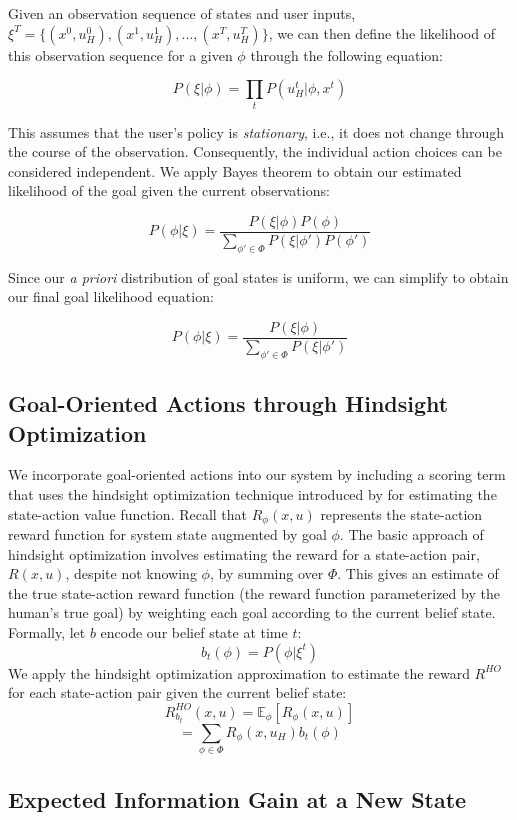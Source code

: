 \documentclass[conference]{IEEEtran}
\begin{document}
Given an observation sequence of states and user inputs, $\xi^T = \{(x^0, u_H^0), (x^1, u_H^1), ..., (x^T, u_H^T)\}$, we can then define the likelihood of this observation sequence for a given $\phi$ through the following equation:

\[
P(\xi|\phi) = \prod_tP(u_H^t|\phi, x^t)
\]

This assumes that the user's policy is \textit{stationary}, i.e., it does not change through the course of the observation. Consequently, the individual action choices can be considered independent. We apply Bayes theorem to obtain our estimated likelihood of the goal given the current observations:

\[
P(\phi|\xi) = \frac{P(\xi|\phi)P(\phi)}{\sum_{\phi' \in \Phi}P(\xi|\phi')P(\phi')}
\]

Since our \textit{a priori} distribution of goal states is uniform, we can simplify to obtain our final goal likelihood equation:

\[
P(\phi|\xi) = \frac{P(\xi|\phi)}{\sum_{\phi' \in \Phi}P(\xi|\phi')}
\]

\subsection{Goal-Oriented Actions through Hindsight Optimization}

We incorporate goal-oriented actions into our system by including a scoring term that uses the hindsight optimization technique introduced by \citet{javdani2015shared} for estimating the state-action value function. Recall that $R_\phi(x, u)$ represents the state-action reward function for system state augmented by goal $\phi$. The basic approach of hindsight optimization involves estimating the reward for a state-action pair, $R(x, u)$, despite not knowing $\phi$, by summing over $\Phi$. This gives an estimate of the true state-action reward function (the reward function parameterized by the human's true goal) by weighting each goal according to the current belief state. Formally, let $b$ encode our belief state at time $t$:
\[
b_t(\phi) = P(\phi|\xi^t)
\]
We apply the hindsight optimization approximation to estimate the reward $R^{HO}$ for each state-action pair given the current belief state:
\[
R^{HO}_{b_t}(x,u) = \mathbb{E}_\phi[R_\phi (x, u)]
\]
\[
=\sum_{\phi \in \Phi} R_\phi (x, u_H)b_t(\phi)
\]

\subsection{Expected Information Gain at a New State}
\end{document}
